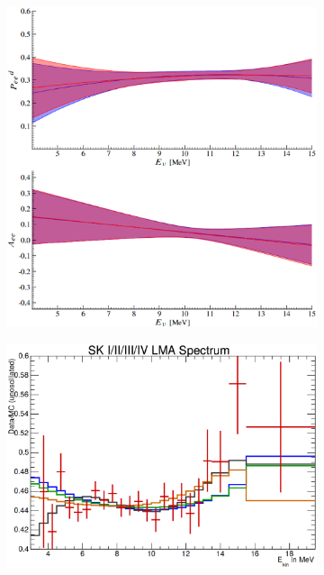 \begin{figure}[htbp]
    \centering
    \begin{subfigure}[b]{0.38\textwidth}
        \centering
    \includegraphics[width=\textwidth]{sno_pee}
        \caption[]{}
        \label{fig:sno_pee}
    \end{subfigure}
    \hfill
    \begin{subfigure}[b]{0.58\textwidth}
        \centering
    \includegraphics[width=\textwidth]{sk_spectrum}
        \caption[]{}
    \end{subfigure}
    \caption[]{}
    \label{fig:es_b8_measurement}
\end{figure}

